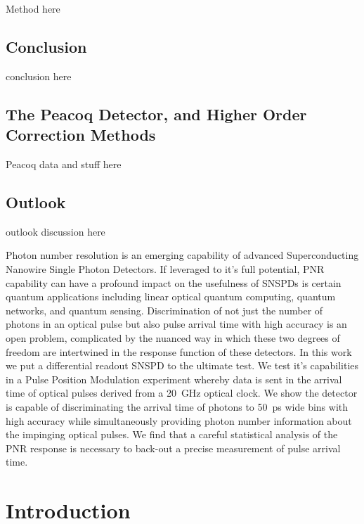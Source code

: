 \documentclass[11pt]{caltech_thesis} %
\begin{document}
Method here

\hypertarget{conclusion}{%
\section{Conclusion}\label{conclusion}}

conclusion here

\hypertarget{the-peacoq-detector-and-higher-order-correction-methods}{%
\section{The Peacoq Detector, and Higher Order Correction
Methods}\label{the-peacoq-detector-and-higher-order-correction-methods}}

Peacoq data and stuff here

\hypertarget{outlook}{%
\section{Outlook}\label{outlook}}

outlook discussion here

Photon number resolution is an emerging capability of advanced
Superconducting Nanowire Single Photon Detectors. If leveraged to it's
full potential, PNR capability can have a profound impact on the
usefulness of SNSPDs is certain quantum applications including linear
optical quantum computing, quantum networks, and quantum sensing.
Discrimination of not just the number of photons in an optical pulse but
also pulse arrival time with high accuracy is an open problem,
complicated by the nuanced way in which these two degrees of freedom are
intertwined in the response function of these detectors. In this work we
put a differential readout SNSPD to the ultimate test. We test it's
capabilities in a Pulse Position Modulation experiment whereby data is
sent in the arrival time of optical pulses derived from a 20~GHz optical
clock. We show the detector is capable of discriminating the arrival
time of photons to 50~ps wide bins with high accuracy while
simultaneously providing photon number information about the impinging
optical pulses. We find that a careful statistical analysis of the PNR
response is necessary to back-out a precise measurement of pulse arrival
time.

\hypertarget{introduction-2}{%
\chapter{Introduction}\label{introduction-2}}
\end{document}
